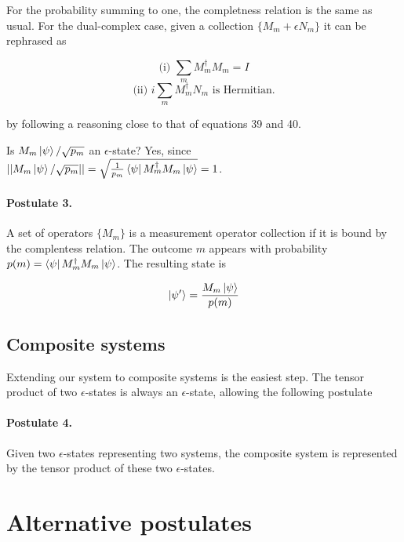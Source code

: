 \documentclass{article}
\newcommand{\e}{\epsilon}
\begin{document}
For the probability summing to one, the completness relation is the same as usual. For the dual-complex case, given a collection $\{M_m + \e N_m \}$ it can be rephrased as

\begin{multicols}{2}
\noindent \begin{equation}
 \text{(i) } \sum_m M_m^\dagger M_m = I
\end{equation}
\columnbreak
\noindent \begin{equation}
 \text{(ii) } i \sum_m M_m^\dagger N_m \text{ is Hermitian.}
\end{equation}
\end{multicols}

\noindent by following a reasoning close to that of equations 39 and 40.

Is $M_m \ket\psi/\sqrt{p_m}$ an $\e$-state? Yes, since $||M_m \ket\psi/\sqrt{p_m}|| = \sqrt{\frac{1}{p_m}\bra\psi M_m^\dagger M_m \ket\psi} = 1$.

\paragraph{Postulate 3.} A set of operators $\{M_m\}$ is a measurement operator collection if it is bound by the complentess relation. The outcome $m$ appears with probability $p(m) = \bra\psi M_m^\dagger M_m \ket\psi$. The resulting state is

\begin{equation}
 \ket{\psi'} = \frac{M_m \ket\psi}{p(m)}
\end{equation}


\subsection{Composite systems}

Extending our system to composite systems is the easiest step. The tensor product of two $\e$-states is always an $\e$-state, allowing the following postulate

\paragraph{Postulate 4.} Given two $\e$-states representing two systems, the composite system is represented by the tensor product of these two $\e$-states.

\section{Alternative postulates}
\end{document}
